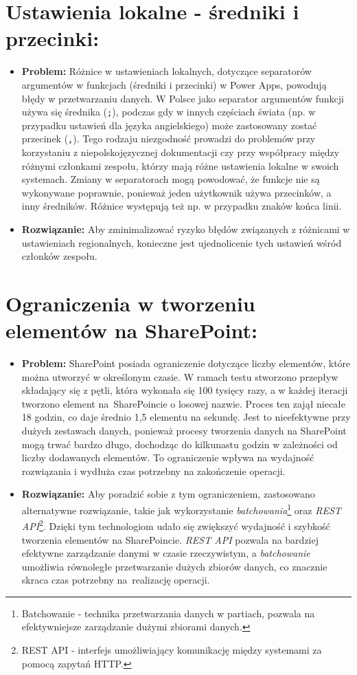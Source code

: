 \section*{Ustawienia lokalne - średniki i przecinki:}
\begin{itemize}
      \item \textbf{Problem:} Różnice w ustawieniach lokalnych, dotyczące separatorów argumentów w funkcjach (średniki i przecinki) w Power Apps, powodują błędy w przetwarzaniu danych. W Polsce jako separator argumentów funkcji używa się średnika (\texttt{;}), podczas gdy w innych częściach świata (np. w przypadku ustawień dla języka angielskiego) może zastosowany zostać przecinek (\texttt{,}). Tego rodzaju niezgodność prowadzi do problemów przy korzystaniu z niepolskojęzycznej dokumentacji czy przy współpracy między różnymi członkami zespołu, którzy mają różne ustawienia lokalne w swoich systemach. Zmiany w separatorach mogą powodować, że funkcje nie są wykonywane poprawnie, ponieważ jeden użytkownik używa przecinków, a inny średników. Różnice występują też np. w przypadku znaków końca linii.
      \item \textbf{Rozwiązanie:} Aby zminimalizować ryzyko błędów związanych z różnicami w ustawieniach regionalnych, konieczne jest ujednolicenie tych ustawień wśród członków zespołu.
\end{itemize}


\section*{Ograniczenia w tworzeniu elementów na SharePoint:}
\begin{itemize}
      \item \textbf{Problem:} SharePoint posiada ograniczenie dotyczące liczby elementów, które można utworzyć w określonym czasie. W ramach testu stworzono przepływ składający się z pętli, która wykonała się 100 tysięcy razy, a w każdej iteracji tworzono element na~SharePoincie o losowej nazwie. Proces ten zajął niecałe 18 godzin, co daje średnio 1,5 elementu na sekundę. Jest to nieefektywne przy dużych zestawach danych, ponieważ procesy tworzenia danych na SharePoint mogą trwać bardzo długo, dochodząc do kilkunastu godzin w zależności od liczby dodawanych elementów. To ograniczenie wpływa na wydajność rozwiązania i wydłuża czas potrzebny na zakończenie operacji.
      \item \textbf{Rozwiązanie:} Aby poradzić sobie z tym ograniczeniem, zastosowano alternatywne rozwiązanie, takie jak wykorzystanie \emph{batchowania}\footnote{Batchowanie - technika przetwarzania danych w partiach, pozwala na efektywniejsze zarządzanie dużymi zbiorami danych.} oraz \emph{REST API}\footnote{REST API - interfejs umożliwiający komunikację między systemami za pomocą zapytań HTTP.}. Dzięki tym technologiom udało się zwiększyć wydajność i szybkość tworzenia elementów na SharePoincie. \emph{REST API} pozwala na bardziej efektywne zarządzanie danymi w czasie rzeczywistym, a \emph{batchowanie} umożliwia równoległe przetwarzanie dużych zbiorów danych, co znacznie skraca czas potrzebny na~realizację operacji.
\end{itemize}

